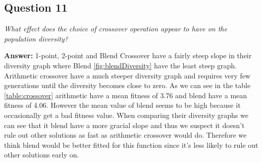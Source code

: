 \documentclass[a4paper]{article}
\begin{document}
\subsection*{Question 11}
\emph{What effect does the choice of crossover operation appear to
have on the population diversity?}

\textbf{Answer:} 1-point, 2-point and Blend Crossover have a fairly steep slope in their diversity graph where Blend \ref{fig:blendDiversity} have the least steep graph. Arithmetic crossover have a much steeper diversity graph and requires very few generations until the diversity becomes close to zero. As we can see in the table \ref{table:crossover} arithmetic have a mean fitness of 3.76 and blend have a mean fitness of 4.06. However the mean value of blend seems to be high because it occasionally get a bad fitness value. When comparing their diversity graphs we can see that it blend have a more gracial slope and thus we suspect it doesn't rule out other solutions as fast as arithmetic crossover would do. Therefore we think blend would be better fitted for this function since it's less likely to rule out other solutions early on.
 
\end{document}
